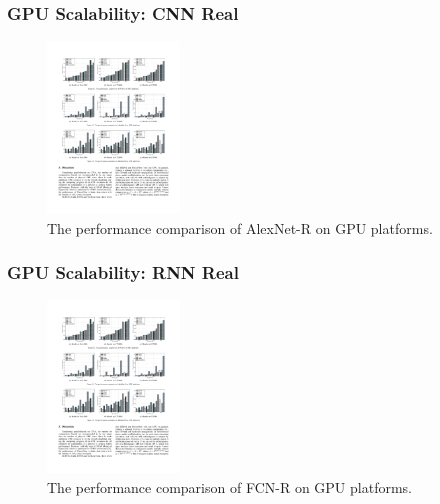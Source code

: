 
\begin{frame}
	\MyLogo
	\frametitle{GPU Scalability: CNN Real}

	\begin{figure}[htbp] 
		\includegraphics[height=1.8in]{figures/AlexNet-R2.pdf} 
		\caption{The performance comparison of AlexNet-R on GPU platforms.}
	\end{figure}

\end{frame}


\begin{frame}
	\MyLogo
	\frametitle{GPU Scalability: RNN Real}
	
	\begin{figure}[htbp] 
		\includegraphics[height=1.8in]{figures/FCN-R2.pdf} 
		\caption{The performance comparison of FCN-R on GPU platforms.}
	\end{figure}

\end{frame}
